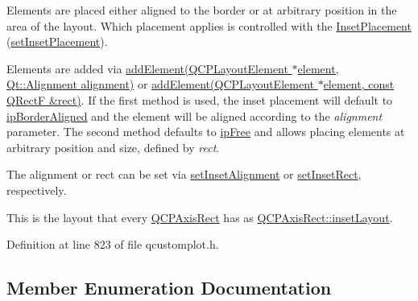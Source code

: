 Elements are placed either aligned to the border or at arbitrary position in the area of the layout. Which placement applies is controlled with the \hyperlink{class_q_c_p_layout_inset_a8b9e17d9a2768293d2a7d72f5e298192}{Inset\+Placement} (\hyperlink{class_q_c_p_layout_inset_a63298830744d5d8c5345511c00fd2144}{set\+Inset\+Placement}).

Elements are added via \hyperlink{class_q_c_p_layout_inset_ad61529eb576af7f04dff94abb10c745a}{add\+Element(\+Q\+C\+P\+Layout\+Element $\ast$element, Qt\+::\+Alignment alignment)} or \hyperlink{class_q_c_p_layout_inset_a8ff61fbee4a1f0ff45c398009d9f1e56}{add\+Element(\+Q\+C\+P\+Layout\+Element $\ast$element, const Q\+Rect\+F \&rect)}. If the first method is used, the inset placement will default to \hyperlink{class_q_c_p_layout_inset_a8b9e17d9a2768293d2a7d72f5e298192aa81e7df4a785ddee2229a8f47c46e817}{ip\+Border\+Aligned} and the element will be aligned according to the {\itshape alignment} parameter. The second method defaults to \hyperlink{class_q_c_p_layout_inset_a8b9e17d9a2768293d2a7d72f5e298192aa4802986ea2cea457f932b115acba59e}{ip\+Free} and allows placing elements at arbitrary position and size, defined by {\itshape rect}.

The alignment or rect can be set via \hyperlink{class_q_c_p_layout_inset_a62882a4f9ad58bb0f53da12fde022abe}{set\+Inset\+Alignment} or \hyperlink{class_q_c_p_layout_inset_aa487c8378a6f9533567a2e6430099dc3}{set\+Inset\+Rect}, respectively.

This is the layout that every \hyperlink{class_q_c_p_axis_rect}{Q\+C\+P\+Axis\+Rect} has as \hyperlink{class_q_c_p_axis_rect_a4114887c7141b59650b7488f930993e5}{Q\+C\+P\+Axis\+Rect\+::inset\+Layout}. 

Definition at line 823 of file qcustomplot.\+h.



\subsection{Member Enumeration Documentation}
\hypertarget{class_q_c_p_layout_inset_a8b9e17d9a2768293d2a7d72f5e298192}{}
